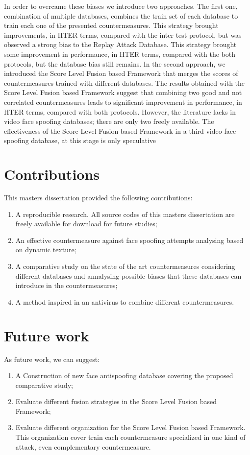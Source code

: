 In order to overcame these biases we introduce two approaches. The first one, combination of multiple databases, combines the train set of each database to train each one of the presented countermeasures. This strategy brought improvements, in HTER terms, compared with the inter-test protocol, but was observed a strong bias to the Replay Attack Database. This strategy brought some improvement in performance, in HTER terms, compared with the both protocols, but the database bias still remains. In the second approach, we introduced the Score Level Fusion based Framework that merges the scores of countermeasures trained with different databases. The results obtained with the Score Level Fusion based Framework suggest that combining two good and not correlated countermeasures leads to significant improvement in performance, in HTER terms, compared with both protocols. However, the literature lacks in video face spoofing databases; there are only two freely available. The effectiveness of the Score Level Fusion based Framework in a third video face spoofing database, at this stage is only speculative

\section{Contributions}

This masters dissertation provided the following contributions:

\begin{enumerate}
	\item A reproducible research. All source codes of this masters dissertation are freely available for download for future studies;
	\item An effective countermeasure against face spoofing attempts analysing  based on dynamic texture; 
	\item A comparative study on the state of the art countermeasures considering different databases and annalysing possible biases that these databases can introduce in the countermeasures;
	\item A method inspired in an antivirus to combine different countermeasures.
\end{enumerate}


\section{Future work}

As future work, we can suggest:

\begin{enumerate}
	\item A Construction of new face antispoofing database covering the proposed comparative study;
	\item Evaluate different fusion strategies in the Score Level Fusion based Framework;
	\item Evaluate different organization for the Score Level Fusion based Framework. This organization cover train each countermeasure specialized in one kind of attack, even complementary countermeasure. 


\end{enumerate}
